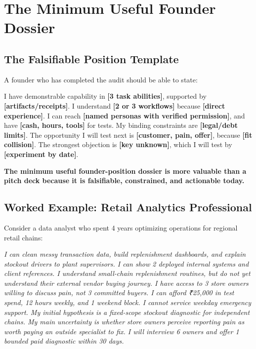 \section{The Minimum Useful Founder Dossier}

\subsection{The Falsifiable Position Template}

A founder who has completed the audit should be able to state:

\begin{tcolorbox}[
  enhanced,
  colback=BayesPale!25!white,
  colframe=BayesBorder!60!white,
  boxrule=0.4pt,
  arc=2pt,
  left=6pt,right=6pt,top=4pt,bottom=4pt,
  before skip=3pt,after skip=4pt
]
\footnotesize\color{BayesInk}
I have demonstrable capability in \textbf{[3 task abilities]}, supported by \textbf{[artifacts/receipts]}. I understand \textbf{[2 or 3 workflows]} because \textbf{[direct experience]}. I can reach \textbf{[named personas with verified permission]}, and have \textbf{[cash, hours, tools]} for tests. My binding constraints are \textbf{[legal/debt limits]}. The opportunity I will test next is \textbf{[customer, pain, offer]}, because \textbf{[fit collision]}. The strongest objection is \textbf{[key unknown]}, which I will test by \textbf{[experiment by date]}.
\end{tcolorbox}

\textbf{The minimum useful founder-position dossier is more valuable than a pitch deck because it is falsifiable, constrained, and actionable today.}

\subsection{Worked Example: Retail Analytics Professional}

Consider a data analyst who spent 4 years optimizing operations for regional retail chains:

\begin{tcolorbox}[
  enhanced,
  colback=white,
  colframe=BayesBorder!80!white,
  boxrule=0.4pt,
  arc=2pt,
  left=5pt,right=5pt,top=4pt,bottom=4pt,
  before skip=3pt,after skip=4pt
]
\footnotesize\color{BayesInk}
\textit{I can clean messy transaction data, build replenishment dashboards, and explain stockout drivers to plant supervisors. I can show 2 deployed internal systems and client references. I understand small-chain replenishment routines, but do not yet understand their external vendor buying journey. I have access to 3 store owners willing to discuss pain, not 3 committed buyers. I can afford ₹25,000 in test spend, 12 hours weekly, and 1 weekend block. I cannot service weekday emergency support. My initial hypothesis is a fixed-scope stockout diagnostic for independent chains. My main uncertainty is whether store owners perceive reporting pain as worth paying an outside specialist to fix. I will interview 6 owners and offer 1 bounded paid diagnostic within 30 days.}
\end{tcolorbox}

